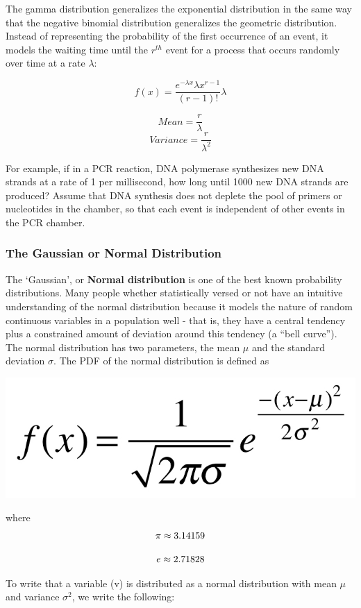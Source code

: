 \documentclass[
]{book}
\begin{document}
The gamma distribution generalizes the exponential distribution in the same way that the negative binomial distribution generalizes the geometric distribution. Instead of representing the probability of the first occurrence of an event, it models the waiting time until the \(r^{th}\) event for a process that occurs randomly over time at a rate \(\lambda\):

\[f(x) = \frac{e^{-\lambda x}\lambda x^{r-1}}{(r-1)!}\lambda\]

\[ Mean =  \frac{r}{\lambda} \]
\[ Variance = \frac{r}{\lambda^2} \]

For example, if in a PCR reaction, DNA polymerase synthesizes new DNA strands at a rate of 1 per millisecond, how long until 1000 new DNA strands are produced? Assume that DNA synthesis does not deplete the pool of primers or nucleotides in the chamber, so that each event is independent of other events in the PCR chamber.

\hypertarget{the-gaussian-or-normal-distribution}{%
\subsubsection{The Gaussian or Normal Distribution}\label{the-gaussian-or-normal-distribution}}

The `Gaussian', or \textbf{Normal distribution} is one of the best known probability distributions. Many people whether statistically versed or not have an intuitive understanding of the normal distribution because it models the nature of random continuous variables in a population well - that is, they have a central tendency plus a constrained amount of deviation around this tendency (a ``bell curve''). The normal distribution has two parameters, the mean \(\mu\) and the standard deviation \(\sigma\). The PDF of the normal distribution is defined as

\begin{center}\includegraphics[width=0.4\linewidth]{images/week_2.032} \end{center}

where
\[\large \pi \approx 3.14159\]

\[\large e \approx 2.71828\]

To write that a variable (v) is distributed as a normal distribution with mean \(\mu\) and variance \(\sigma^2\), we write the following:
\end{document}
